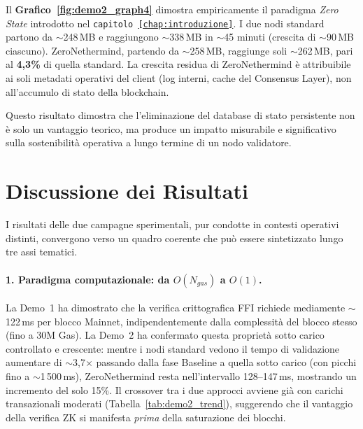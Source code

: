 \documentclass[12pt,a4paper,openright,twoside]{report}
\begin{document}
Il \textbf{Grafico~\ref{fig:demo2_graph4}} dimostra empiricamente il paradigma \textit{Zero State} introdotto nel \texttt{capitolo \ref{chap:introduzione}}. I due nodi standard partono da $\sim$248\,MB e raggiungono $\sim$338\,MB in $\sim$45 minuti (crescita di $\sim$90\,MB ciascuno). ZeroNethermind, partendo da $\sim$258\,MB, raggiunge soli $\sim$262\,MB, pari al \textbf{4,3\%} di quella standard. La crescita residua di ZeroNethermind è attribuibile ai soli metadati operativi del client (log interni, cache del Consensus Layer), non all'accumulo di stato della blockchain. 

Questo risultato dimostra che l'eliminazione del database di stato persistente non è solo un vantaggio teorico, ma produce un impatto misurabile e significativo sulla sostenibilità operativa a lungo termine di un nodo validatore.

\section{Discussione dei Risultati}\label{sec:discussione}

I risultati delle due campagne sperimentali, pur condotte in contesti operativi distinti, convergono verso un quadro coerente che può essere sintetizzato lungo tre assi tematici.

\paragraph{1. Paradigma computazionale: da $O(N_{gas})$ a $O(1)$.}
La Demo~1 ha dimostrato che la verifica crittografica FFI richiede mediamente $\sim$122\,ms per blocco Mainnet, indipendentemente dalla complessità del blocco stesso (fino a 30M Gas). La Demo~2 ha confermato questa proprietà sotto carico controllato e crescente: mentre i nodi standard vedono il tempo di validazione aumentare di $\sim$3,7$\times$ passando dalla fase Baseline a quella sotto carico (con picchi fino a $\sim$1\,500\,ms), ZeroNethermind resta nell'intervallo 128--147\,ms, mostrando un incremento del solo 15\%. Il crossover tra i due approcci avviene già con carichi transazionali moderati (Tabella~\ref{tab:demo2_trend}), suggerendo che il vantaggio della verifica ZK si manifesta \textit{prima} della saturazione dei blocchi.
\end{document}
